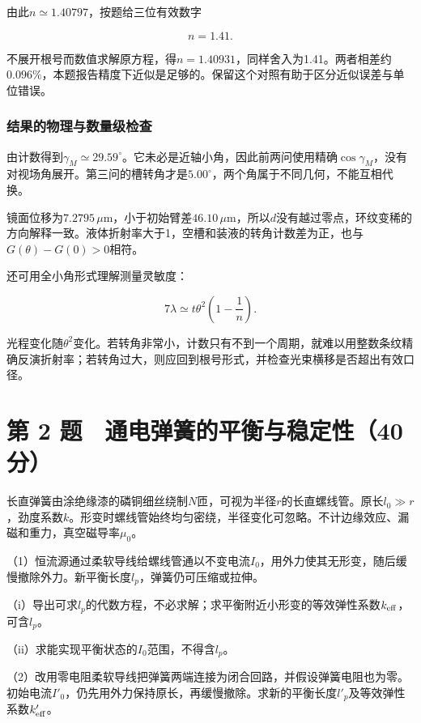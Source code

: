 \documentclass[12pt,a4paper,fontset=fandol]{ctexart}
\begin{document}
由此\(n\simeq1.40797\)，按题给三位有效数字

\[
\boxed{n=1.41}.
\]

不展开根号而数值求解原方程，得\(n=1.40931\)，同样舍入为1.41。两者相差约\(0.096\%\)，本题报告精度下近似是足够的。保留这个对照有助于区分近似误差与单位错误。

\subsubsection{结果的物理与数量级检查}\label{ux7ed3ux679cux7684ux7269ux7406ux4e0eux6570ux91cfux7ea7ux68c0ux67e5}

由计数得到\(\gamma_M\simeq29.59^\circ\)。它未必是近轴小角，因此前两问使用精确\(\cos\gamma_M\)，没有对视场角展开。第三问的槽转角才是\(5.00^\circ\)，两个角属于不同几何，不能互相代换。

镜面位移为\(7.2795\,\mu\mathrm m\)，小于初始臂差\(46.10\,\mu\mathrm m\)，所以\(d\)没有越过零点，环纹变稀的方向解释一致。液体折射率大于1，空槽和装液的转角计数差为正，也与\(G(\theta)-G(0)>0\)相符。

还可用全小角形式理解测量灵敏度：

\[
7\lambda\simeq t\theta^2\left(1-\frac1n\right).
\]

光程变化随\(\theta^2\)变化。若转角非常小，计数只有不到一个周期，就难以用整数条纹精确反演折射率；若转角过大，则应回到根号形式，并检查光束横移是否超出有效口径。

\clearpage

\section{第 2
题　通电弹簧的平衡与稳定性（40分）}\label{ux7b2c-2-ux9898-ux901aux7535ux5f39ux7c27ux7684ux5e73ux8861ux4e0eux7a33ux5b9aux602740ux5206}

长直弹簧由涂绝缘漆的磷铜细丝绕制\(N\)匝，可视为半径\(r\)的长直螺线管。原长\(l_0\gg r\)，劲度系数\(k\)。形变时螺线管始终均匀密绕，半径变化可忽略。不计边缘效应、漏磁和重力，真空磁导率\(\mu_0\)。

（1）恒流源通过柔软导线给螺线管通以不变电流\(I_0\)，用外力使其无形变，随后缓慢撤除外力。新平衡长度\(l_p\)，弹簧仍可压缩或拉伸。

（i）导出可求\(l_p\)的代数方程，不必求解；求平衡附近小形变的等效弹性系数\(k_{\rm eff}\)，可含\(l_p\)。

（ii）求能实现平衡状态的\(I_0\)范围，不得含\(l_p\)。

（2）改用零电阻柔软导线把弹簧两端连接为闭合回路，并假设弹簧电阻也为零。初始电流\(I'_0\)，仍先用外力保持原长，再缓慢撤除。求新的平衡长度\(l'_p\)及等效弹性系数\(k'_{\rm eff}\)。
\end{document}

